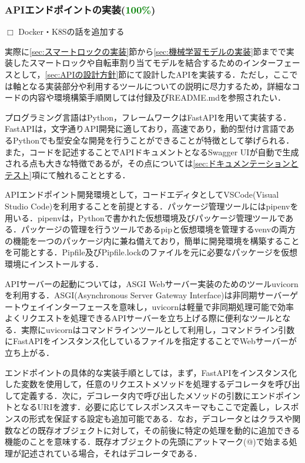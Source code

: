       \subsubsection{APIエンドポイントの実装(\textcolor{green}{100\%})}
        \label{sec:APIエンドポイントの実装}
          \par $\Box$ Docker・K8Sの話を追加する
          \par 実際に\ref{sec:スマートロックの実装}節から\ref{sec:機械学習モデルの実装}節までで実装したスマートロックや自転車割り当てモデルを結合するためのインターフェースとして，\ref{sec:APIの設計方針}節にて設計したAPIを実装する．ただし，ここでは軸となる実装部分や利用するツールについての説明に尽力するため，詳細なコードの内容や環境構築手順関しては付録及びREADME.mdを参照されたい．
          \par プログラミング言語はPython，フレームワークはFastAPIを用いて実装する．FastAPIは，文字通りAPI開発に適しており，高速であり，動的型付け言語であるPythonでも型安全な開発を行うことができることが特徴として挙げられる．また，コードを記述することでAPIドキュメントとなるSwagger UIが自動で生成される点も大きな特徴であるが，その点については\ref{sec:ドキュメンテーションとテスト}項にて触れることとする．
          \par APIエンドポイント開発環境として，コードエディタとしてVSCode(Visual Studio Code)を利用することを前提とする．パッケージ管理ツールにはpipenvを用いる．pipenvは，Pythonで書かれた仮想環境及びパッケージ管理ツールである．パッケージの管理を行うツールであるpipと仮想環境を管理するvenvの両方の機能を一つのパッケージ内に兼ね備えており，簡単に開発環境を構築することを可能とする．Pipfile及びPipfile.lockのファイルを元に必要なパッケージを仮想環境にインストールする．
          \par APIサーバーの起動については，ASGI Webサーバー実装のためのツールuvicornを利用する．ASGI(Asynchronous Server Gateway Interface)は非同期サーバーゲートウェイインターフェースを意味し，uvicornは軽量で非同期処理可能で効率よくリクエストを処理できるAPIサーバーを立ち上げる際に便利なツールとなる．実際にuvicornはコマンドラインツールとして利用し，コマンドライン引数にFastAPIをインスタンス化しているファイルを指定することでWebサーバーが立ち上がる．
          \par エンドポイントの具体的な実装手順としては，まず，FastAPIをインスタンス化した変数を使用して，任意のリクエストメソッドを処理するデコレータを呼び出して定義する．次に，デコレータ内で呼び出したメソッドの引数にエンドポイントとなるURIを渡す．必要に応じてレスポンススキーマもここで定義し，レスポンスの形式を保証する設定も追加可能である．なお，デコレータとはクラスや関数などの既存オブジェクトに対して，その前後に特定の処理を動的に追加できる機能のことを意味する．既存オブジェクトの先頭にアットマーク(@)で始まる処理が記述されている場合，それはデコレータである．
